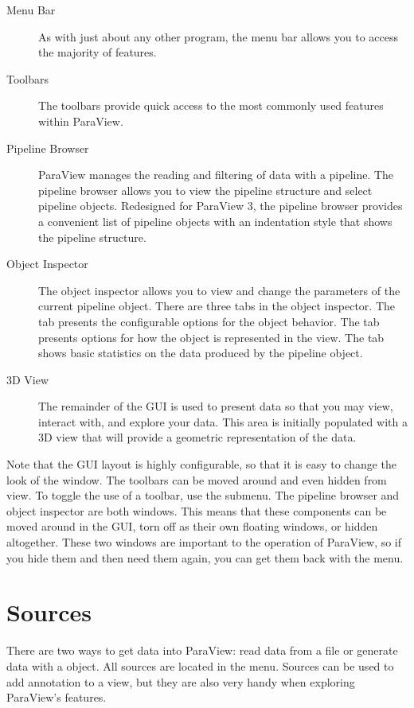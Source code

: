 \begin{description}
\item[Menu Bar]  As with just about any other program, the
  menu bar allows you to access the majority of features.
\item[Toolbars]  The toolbars provide quick access to the
  most commonly used features within ParaView.
\item[Pipeline Browser]  ParaView manages the
  reading and filtering of data with a pipeline.  The pipeline browser
  allows you to view the pipeline structure and select pipeline objects.
  Redesigned for ParaView 3, the pipeline browser provides a convenient
  list of pipeline objects with an indentation style that shows the
  pipeline structure.
\item[Object Inspector]  The object inspector
  allows you to view and change the parameters of the current pipeline
  object.  There are three tabs in the object inspector.  The
   tab presents the configurable options for the object
  behavior.  The  tab presents options for how the object
  is represented in the view.  The  tab shows basic
  statistics on the data produced by the pipeline object.
\item[3D View]  The remainder of the GUI is used to present
  data so that you may view, interact with, and explore your data.  This
  area is initially populated with a 3D view that will provide a geometric
  representation of the data.
\end{description}

Note that the GUI layout is highly configurable, so that it is easy to
change the look of the window.  The toolbars can be moved around and even
hidden from view.  To toggle the use of a toolbar, use the  \ra
{} submenu.  The pipeline browser and object inspector are both
 windows.  This means that these components can be moved
around in the GUI, torn off as their own floating windows, or hidden
altogether.  These two windows are important to the operation of ParaView,
so if you hide them and then need them again, you can get them back with
the  menu.


\section{Sources}

There are two ways to get data into ParaView: read data from a file or
generate data with a  object.  All sources are located in
the  menu.  Sources can be used to add annotation to a view,
but they are also very handy when exploring ParaView’s features.

